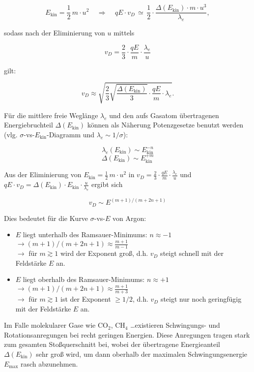 \[ E_\text{kin} = \frac{1}{2}\, m \cdot u^2 ~~~~~\Rightarrow ~~~~~ qE\cdot v_D\, \simeq\,
\frac{1}{2}\cdot \frac{\Delta(E_\text{kin})\cdot m\cdot u^3}{\lambda_e} , \]

sodass nach der Eliminierung von $u$ mittels

\[v_D = \frac{2}{3} \cdot \frac{qE}{m}\cdot \frac{\lambda_e}{u} \]

gilt:

\[v_D \approx \sqrt{\frac{2}{3}\sqrt{\frac{\Delta(E_\text{kin})}{3}}\cdot
\frac{qE}{m}\cdot\lambda_e}.
\]

Für die mittlere freie Weglänge $\lambda_e$ und den aufs Gasatom übertragenen Energiebruchteil
$\Delta(E_\text{kin})$ können als Näherung Potenzgesetze benutzt werden (vlg.
$\sigma$-vs-$E_\text{kin}$-Diagramm und $\lambda_e\sim1/\sigma$):

\[\lambda_e(E_\text{kin})\sim E_\text{kin}^{-n}  \]
\[\Delta(E_\text{kin})\sim E_\text{kin}^{+m} \]

Aus der Eliminierung von $E_\text{kin}=\frac{1}{2}\,m\cdot u^2$ in $v_D = \frac{2}{3} \cdot
\frac{qE}{m}\cdot \frac{\lambda_e}{u}$ und $qE\cdot v_D = \Delta(E_\text{kin})\cdot
E_\text{kin}\cdot \frac{u}{\lambda_e}$ ergibt sich

\[v_D \sim E ^{(m+1)/(m+2n+1)}  \]

Dies bedeutet für die Kurve $\sigma$-vs-$E$ von Argon:

\begin{itemize}
  \item $E$ liegt unterhalb des Ramsauer-Minimums: $n\approx -1$\\
  $\rightarrow (m+1)/(m+2n+1)\approx \frac{m+1}{m-1}$\\
  $\rightarrow$ für $m\gtrsim 1$ wird der Exponent groß, d.h. $v_D$ steigt schnell mit der
  Feldstärke $E$ an.
  \item $E$ liegt oberhalb des Ramsauer-Minimums: $n\approx +1$\\
  $\rightarrow (m+1)/(m+2n+1)\approx \frac{m+1}{m+3}$\\
  $\rightarrow$ für $m\gtrsim 1$ ist der Exponent $\ge1/2$, d.h. $v_D$ steigt nur noch geringfügig
  mit der Feldstärke $E$ an.
\end{itemize}

Im Falle molekularer Gase wie CO$_2$, CH$_4$ \ldots existieren Schwingungs- und Rotationsanregungen
bei recht geringen Energien. Diese Anregungen tragen stark zum gesamten Stoßquerschnitt bei, wobei
der übertragene Energieanteil $\Delta(E_\text{kin})$ sehr groß wird, um dann oberhalb der maximalen
Schwingungsenergie $E_\text{max}$ rasch abzunehmen.

